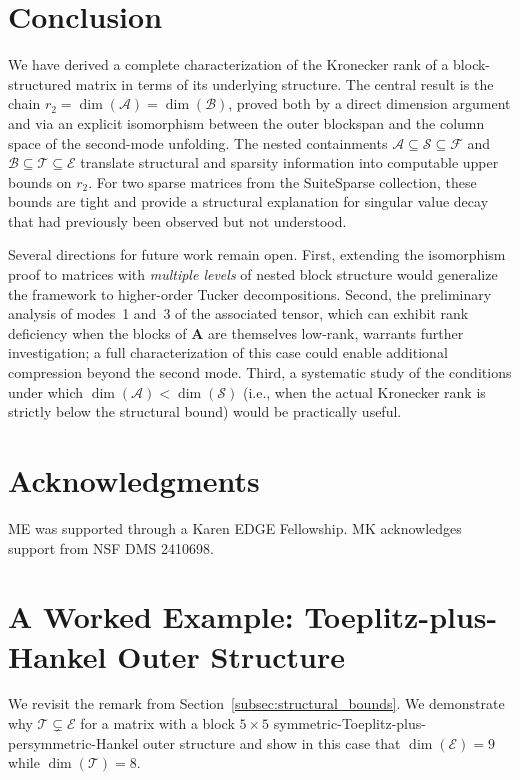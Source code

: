 \documentclass{siamart251216}
\def\bA{\mathbf{A}}
\begin{document}
\section{Conclusion}
\label{sec:conclusion}

We have derived a complete characterization of the Kronecker rank of a block-structured matrix in
terms of its underlying structure.  The central result is the chain
$r_2 = \dim(\mathscr{A}) = \dim(\mathscr{B})$, proved both by a direct dimension argument and via
an explicit isomorphism between the outer blockspan and the column space of the second-mode
unfolding.  The nested containments $\mathscr{A}\subseteq\mathscr{S}\subseteq\mathscr{F}$ and
$\mathscr{B}\subseteq\mathscr{T}\subseteq\mathscr{E}$ translate structural and sparsity
information into computable upper bounds on $r_2$.  For two sparse matrices from the SuiteSparse
collection, these bounds are tight and provide a structural explanation for singular value decay
that had previously been observed but not understood.

Several directions for future work remain open.  First, extending the isomorphism proof to
matrices with \emph{multiple levels} of nested block structure would generalize the framework to
higher-order Tucker decompositions.  Second, the preliminary analysis of modes~1 and~3 of the
associated tensor, which can exhibit rank deficiency when the blocks of $\bA$ are themselves
low-rank, warrants further investigation; a full characterization of this case could enable
additional compression beyond the second mode.  Third, a systematic study of the conditions under
which $\dim(\mathscr{A})<\dim(\mathscr{S})$ (i.e., when the actual Kronecker rank is strictly
below the structural bound) would be practically useful.

\section*{Acknowledgments}
ME was supported through a Karen EDGE Fellowship. MK acknowledges support from NSF DMS 2410698.


\appendix
\section{A Worked Example: Toeplitz-plus-Hankel Outer Structure}
\label{app:t+h_worked}

We revisit the remark from Section~\ref{subsec:structural_bounds}. We demonstrate why $\mathscr{T}\subsetneq\mathscr{E}$ for a matrix with a block $5\times 5$
symmetric-Toeplitz-plus-persymmetric-Hankel outer structure and show in this case
 that $\dim(\mathscr{E})=9$ while $\dim(\mathscr{T})=8$.
\end{document}
